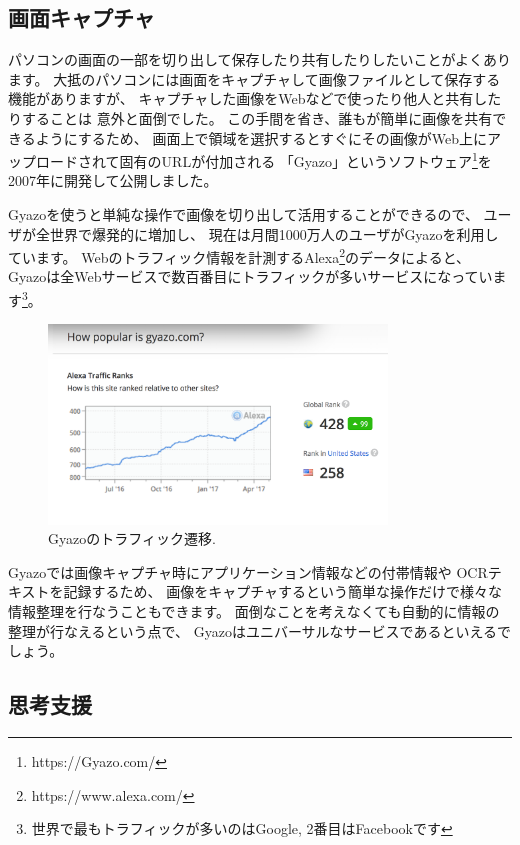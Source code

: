 \documentclass[topics]{compsoft} %
\begin{document}
\subsection{画面キャプチャ}

パソコンの画面の一部を切り出して保存したり共有したりしたいことがよくあります。
大抵のパソコンには画面をキャプチャして画像ファイルとして保存する機能がありますが、
キャプチャした画像をWebなどで使ったり他人と共有したりすることは
意外と面倒でした。
この手間を省き、誰もが簡単に画像を共有できるようにするため、
画面上で領域を選択するとすぐにその画像がWeb上にアップロードされて固有のURLが付加される
「Gyazo」というソフトウェア\footnote{
  \textsf{https:{\slash}{\slash}Gyazo.com{\slash}}
}を2007年に開発して公開しました。

Gyazoを使うと単純な操作で画像を切り出して活用することができるので、
ユーザが全世界で爆発的に増加し、
現在は月間1000万人のユーザがGyazoを利用しています。
%
Webのトラフィック情報を計測するAlexa\footnote{
  \textsf{https:{\slash}{\slash}www.alexa.com{\slash}}
}のデータによると、
Gyazoは全Webサービスで数百番目にトラフィックが多いサービスになっています\footnote{
  世界で最もトラフィックが多いのはGoogle, 2番目はFacebookです
}。

\begin{figure}[h]
  \includegraphics[width=9cm,bb=0 0 1134 668]{figures/2595e48e8346b423d6e6c1d23daf10f4.png}
  \caption{Gyazoのトラフィック遷移.}
  \label{alexa}
\end{figure}

Gyazoでは画像キャプチャ時にアプリケーション情報などの付帯情報や
OCRテキストを記録するため、
画像をキャプチャするという簡単な操作だけで様々な情報整理を行なうこともできます。
面倒なことを考えなくても自動的に情報の整理が行なえるという点で、
Gyazoはユニバーサルなサービスであるといえるでしょう。

\subsection{思考支援}
\end{document}
